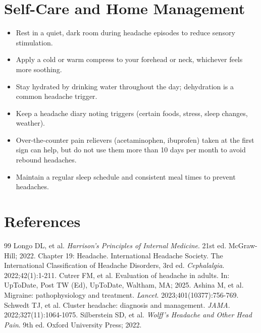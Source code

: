 \section*{Self-Care and Home Management}
\begin{itemize}
  \item Rest in a quiet, dark room during headache episodes to reduce sensory stimulation.
  \item Apply a cold or warm compress to your forehead or neck, whichever feels more soothing.
  \item Stay hydrated by drinking water throughout the day; dehydration is a common headache trigger.
  \item Keep a headache diary noting triggers (certain foods, stress, sleep changes, weather).
  \item Over-the-counter pain relievers (acetaminophen, ibuprofen) taken at the first sign can help, but do not use them more than 10 days per month to avoid rebound headaches.
  \item Maintain a regular sleep schedule and consistent meal times to prevent headaches.
\end{itemize}

\section*{References}

\begin{thebibliography}{99}
 Longo DL, et al. \emph{Harrison's Principles of Internal Medicine}. 21st ed. McGraw-Hill; 2022. Chapter 19: Headache.
 International Headache Society. The International Classification of Headache Disorders, 3rd ed. \emph{Cephalalgia}. 2022;42(1):1-211.
 Cutrer FM, et al. Evaluation of headache in adults. In: UpToDate, Post TW (Ed), UpToDate, Waltham, MA; 2025.
 Ashina M, et al. Migraine: pathophysiology and treatment. \emph{Lancet}. 2023;401(10377):756-769.
 Schwedt TJ, et al. Cluster headache: diagnosis and management. \emph{JAMA}. 2022;327(11):1064-1075.
 Silberstein SD, et al. \emph{Wolff's Headache and Other Head Pain}. 9th ed. Oxford University Press; 2022.
\end{thebibliography}
